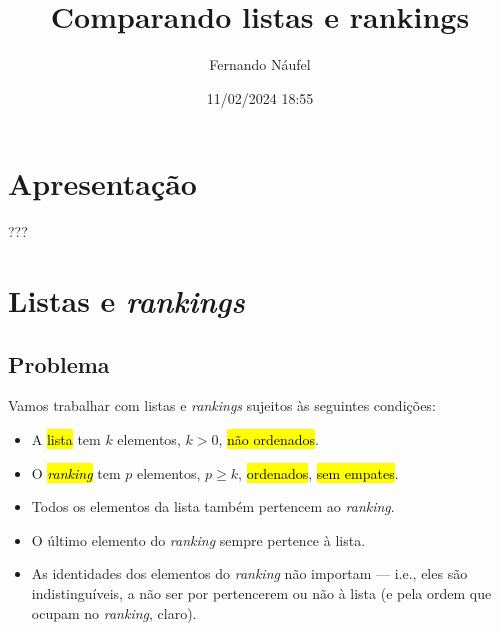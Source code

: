 \documentclass[
  letterpaper,
  DIV=11,
  numbers=noendperiod]{scrreprt}
\title{Comparando listas e rankings}
\author{Fernando Náufel}
\date{11/02/2024 18:55}
\renewcommand*\contentsname{Índice}
\newcommand\contentsname{Índice}
\begin{document}
\maketitle

\makeatletter
{}
{}
{}
\makeatother


\renewcommand*\contentsname{Índice}
{
\hypersetup{linkcolor=}
\setcounter{tocdepth}{2}
\tableofcontents
}

\chapter*{Apresentação}\label{apresentauxe7uxe3o}


???


\chapter{\texorpdfstring{Listas e
\emph{rankings}}{Listas e rankings}}\label{listas-e-rankings}

\section{Problema}\label{problema}

Vamos trabalhar com listas e \emph{rankings} sujeitos às seguintes
condições:

\begin{itemize}
\item
  A {\hl{lista}} tem $k$ elementos, $k > 0$, {\hl{não ordenados}}.
\item
  O {\hl{\emph{ranking}}} tem $p$ elementos, $p \geq k$,
  {\hl{ordenados}}, {\hl{sem empates}}.
\item
  Todos os elementos da lista também pertencem ao \emph{ranking}.
\item
  O último elemento do \emph{ranking} sempre pertence à lista.
\item
  As identidades dos elementos do \emph{ranking} não importam --- i.e.,
  eles são indistinguíveis, a não ser por pertencerem ou não à lista (e
  pela ordem que ocupam no \emph{ranking}, claro).
\end{itemize}
\end{document}
